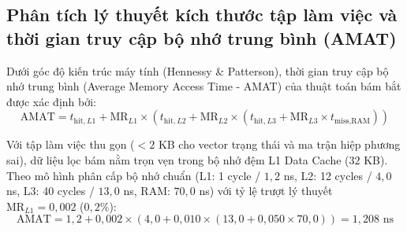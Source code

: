 \begin{table}[H]
\centering
\caption{Đối chuẩn năng lực tính toán lý thuyết và ngân sách thời gian giữa các kiến trúc vi xử lý}
\label{tab:platform-comparison-w12}
\end{table}

\subsection{Phân tích lý thuyết kích thước tập làm việc và thời gian truy cập bộ nhớ trung bình (AMAT)}

\hspace{0.5cm} Dưới góc độ kiến trúc máy tính (Hennessy \& Patterson), thời gian truy cập bộ nhớ trung bình (Average Memory Access Time - AMAT) của thuật toán bám bắt được xác định bởi:
\begin{equation}
\text{AMAT} = t_{\text{hit}, L1} + \text{MR}_{L1} \times \left( t_{\text{hit}, L2} + \text{MR}_{L2} \times \left( t_{\text{hit}, L3} + \text{MR}_{L3} \times t_{\text{miss}, \text{RAM}} \right) \right)
\label{eq:amat-formula-definition-clean}
\end{equation}

Với tập làm việc thu gọn ($< 2$ KB cho vector trạng thái và ma trận hiệp phương sai), dữ liệu lọc bám nằm trọn vẹn trong bộ nhớ đệm L1 Data Cache ($32$ KB). Theo mô hình phân cấp bộ nhớ chuẩn (L1: 1 cycle / $1{,}2$ ns, L2: 12 cycles / $4{,}0$ ns, L3: 40 cycles / $13{,}0$ ns, RAM: $70{,}0$ ns) với tỷ lệ trượt lý thuyết $\text{MR}_{L1} = 0{,}002$ ($0{,}2\%$):
\begin{equation}
\text{AMAT} = 1{,}2 + 0{,}002 \times \left( 4{,}0 + 0{,}010 \times \left( 13{,}0 + 0{,}050 \times 70{,}0 \right) \right) = 1{,}208\text{ ns}
\label{eq:amat-calculated-value-clean}
\end{equation}

